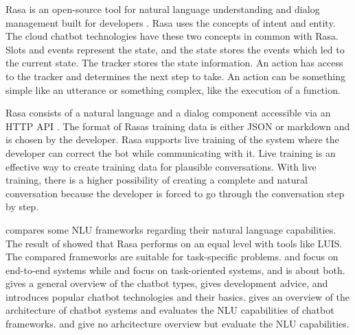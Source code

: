 Rasa is an open-source tool for natural language understanding and dialog management built for developers \cite{rasabocklisch2017}.
Rasa uses the concepts of intent and entity. 
The cloud chatbot technologies have these two concepts in common with Rasa.
Slots and events represent the state, and the state stores the events which led to the current state. 
The tracker stores the state information.
An action has access to the tracker and determines the next step to take. 
An action can be something simple like an utterance or something complex, like the execution of a function.

Rasa consists of a natural language and a dialog component accessible via an HTTP API \cite{rasabocklisch2017}.
The format of Rasas training data is either JSON or markdown and is chosen by the developer.
Rasa supports live training of the system where the developer can correct the bot while communicating with it.
Live training is an effective way to create training data for plausible conversations.
With live training, there is a higher possibility of creating a complete and natural conversation because the developer is forced to go through the conversation step by step.


\citet{braunEvaluatingNLU} compares some NLU frameworks regarding their natural language capabilities.
The result of \citet{braunEvaluatingNLU} showed that Rasa performs on an equal level with tools like LUIS.
The compared frameworks are suitable for task-specific problems.
\citet{evaluateChatbotsShawar2007,bordes2016learning} and \citet{williams2017hybrid} focus on end-to-end systems while \citet{braunEvaluatingNLU, dutta2017developing,luis2015williams,rasabocklisch2017,pharmacybot} and \citet{gregori2017evaluation} focus on task-oriented systems, and \citet{singhbuilding} is about both.
\citet{singhbuilding} gives a general overview of the chatbot types, gives development advice, and introduces popular chatbot technologies and their basics.
\citet{braunEvaluatingNLU} gives an overview of the architecture of chatbot systems and evaluates the NLU capabilities of chatbot frameworks.
\citet{gregori2017evaluation} and \citet{dutta2017developing} give no arhcitecture overview but evaluate the NLU capabilities.

